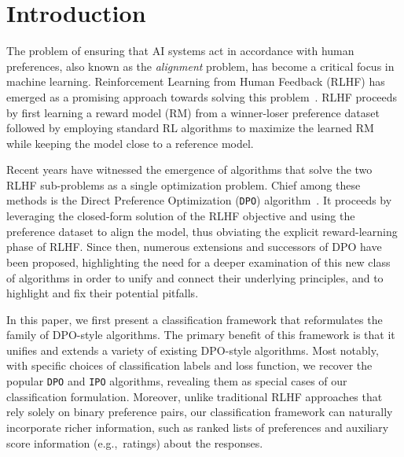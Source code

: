 \section{Introduction}
The problem of ensuring that AI systems act in accordance with human preferences, also known as the {\em alignment} problem, has become a critical focus in machine learning. Reinforcement Learning from Human Feedback (RLHF) has emerged as a promising approach towards solving this problem~\citep{RLHF}. RLHF proceeds by first learning a reward model (RM) from a winner-loser preference dataset followed by employing standard RL algorithms to maximize the learned RM while keeping the model close to a reference model. 

Recent years have witnessed the emergence of algorithms that solve the two RLHF sub-problems as a single optimization problem. Chief among these methods is the Direct Preference Optimization (\texttt{DPO}) algorithm~\cite{DPO}. It proceeds by leveraging the closed-form solution of the RLHF objective and using the preference dataset to align the model, thus obviating the explicit reward-learning phase of RLHF. Since then, numerous extensions and successors of DPO have been proposed, highlighting the need for a deeper examination of this new class of algorithms in order to unify and connect their underlying principles, and to highlight and fix their potential pitfalls.

In this paper, we first present a classification framework that reformulates the family of DPO-style algorithms. The primary benefit of this framework is that it unifies and extends a variety of existing DPO-style algorithms. Most notably, with specific choices of classification labels and loss function, we recover the popular \texttt{DPO} \cite{DPO} and \texttt{IPO} \cite{IPO} algorithms, revealing them as special cases of our classification formulation. Moreover, unlike traditional RLHF approaches that rely solely on binary preference pairs, our classification framework can naturally incorporate richer information, such as ranked lists of preferences and auxiliary score information (e.g.,~ratings) about the responses. %

